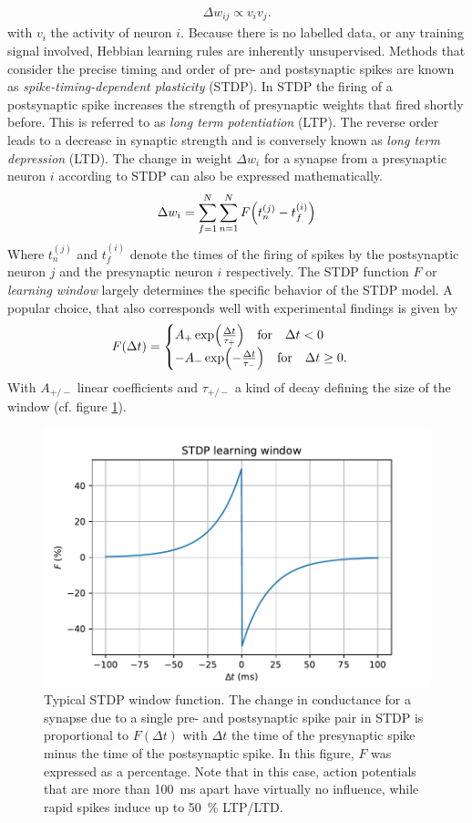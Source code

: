 \begin{align}
    \Delta w_{ij} \propto v_i v_j.
\end{align}
with $v_i$ the activity of neuron $i$. Because there is no labelled data, or any training signal involved, Hebbian learning rules are inherently unsupervised. Methods that consider the precise timing and order of pre- and postsynaptic spikes are known as \emph{spike-timing-dependent plasticity} (STDP). In STDP the firing of a postsynaptic spike increases the strength of presynaptic weights that fired shortly before. This is referred to as \emph{long term potentiation} (LTP). The reverse order leads to a decrease in synaptic strength and is conversely known as \emph{long term depression} (LTD). The change in weight $\Delta w_i$ for a synapse from a presynaptic neuron $i$ according to STDP can also be expressed mathematically.
\begin{align}
    \Delta w_i = \sum_{f=1}^N\sum_{n=1}^NF\qty(t_n^{(j)}-t_f^{(i)})
\end{align}
Where $t_n^{(j)}$ and $t_f^{(i)}$ denote the times of the firing of spikes by the postsynaptic neuron $j$ and the presynaptic neuron $i$ respectively. The STDP function $F$ or \emph{learning window} largely determines the specific behavior of the STDP model. A popular choice, that also corresponds well with experimental findings \cite{song2000competitive} is given by
\begin{align}
    F(\Delta t) = \begin{cases}
      A_+\exp(\frac{\Delta t}{\tau_+})\qq{for} \Delta t < 0\\
      -A_-\exp(-\frac{\Delta t}{\tau_-})\qq{for} \Delta t \geq 0.
    \end{cases}
\end{align}
With $A_{+/-}$ linear coefficients and $\tau_{+/-}$ a kind of decay defining the size of the window (cf. figure \ref{fig:stdp}).
\begin{figure}[H]
    \centering
\includegraphics[width=.75\textwidth]{figures/stdp_window.pdf}
\caption[Typical STDP window function]{Typical STDP window function. The change in conductance for a synapse due to a single pre- and postsynaptic spike pair in STDP is proportional to $F(\Delta t)$ with $\Delta t$ the time of the presynaptic spike minus the time of the postsynaptic spike. In this figure, $F$ was expressed as a percentage. Note that in this case, action potentials that are more than \SI{100}{\milli\second} apart have virtually no influence, while rapid spikes induce up to \SI{50}{\percent} LTP/LTD.}\label{fig:stdp}
\end{figure}\noindent
